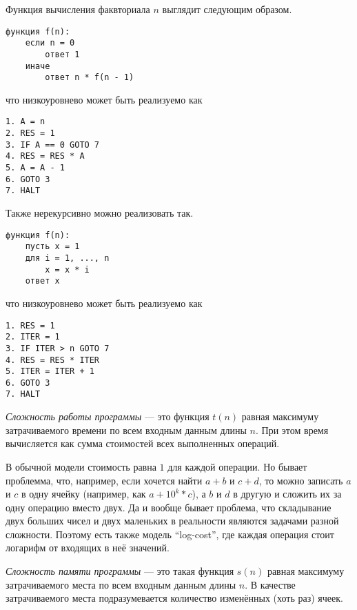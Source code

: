 \documentclass[12pt,a4paper]{article}
\begin{document}
    \begin{example}
        Функция вычисления факвториала $n$ выглядит следующим образом.
        \begin{verbatim}
функция f(n):
    если n = 0
        ответ 1
    иначе
        ответ n * f(n - 1)
        \end{verbatim}
        что низкоуровнево может быть реализуемо как
        \begin{verbatim}
1. A = n
2. RES = 1
3. IF A == 0 GOTO 7
4. RES = RES * A
5. A = A - 1
6. GOTO 3
7. HALT
        \end{verbatim}
        Также нерекурсивно можно реализовать так.
        \begin{verbatim}
функция f(n):
    пусть x = 1
    для i = 1, ..., n
        x = x * i
    ответ x
        \end{verbatim}
        что низкоуровнево может быть реализуемо как
        \begin{verbatim}
1. RES = 1
2. ITER = 1
3. IF ITER > n GOTO 7
4. RES = RES * ITER
5. ITER = ITER + 1
6. GOTO 3
7. HALT
        \end{verbatim}
    \end{example}

    \begin{definition}
        \emph{Сложность работы программы} --- это функция $t(n)$ равная максимуму затрачиваемого времени по всем входным данным длины $n$. При этом время вычисляется как сумма стоимостей всех выполненных операций.
        
        В обычной модели стоимость равна $1$ для каждой операции. Но бывает проблемма, что, например, если хочется найти $a + b$ и $c + d$, то можно записать $a$ и $c$ в одну ячейку (например, как $a + 10^k * c$), а $b$ и $d$ в другую и сложить их за одну операцию вместо двух. Да и вообще бывает проблема, что складывание двух больших чисел и двух маленьких в реальности являются задачами разной сложности. Поэтому есть также модель ``log-cost'', где каждая операция стоит логарифм от входящих в неё значений.
    \end{definition}

    \begin{definition}
        \emph{Сложность памяти программы} --- это такая функция $s(n)$ равная максимуму затрачиваемого места по всем входным данным длины $n$. В качестве затрачиваемого места подразумевается количество изменённых (хоть раз) ячеек.
    \end{definition}
\end{document}
